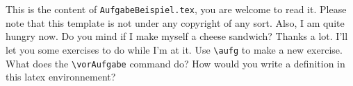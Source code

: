 
This is the content of \verb?AufgabeBeispiel.tex?, you are welcome to read it. Please note that this template is not under any copyright of any sort. Also, I am quite hungry now. Do you mind if I make myself a cheese sandwich? Thanks a lot. I'll let you some exercises to do while I'm at it.
\aufg
Use \verb?\aufg? to make a new exercise.
\aufg What does the \verb?\vorAufgabe? command do? How would you write a definition in this latex environnement?